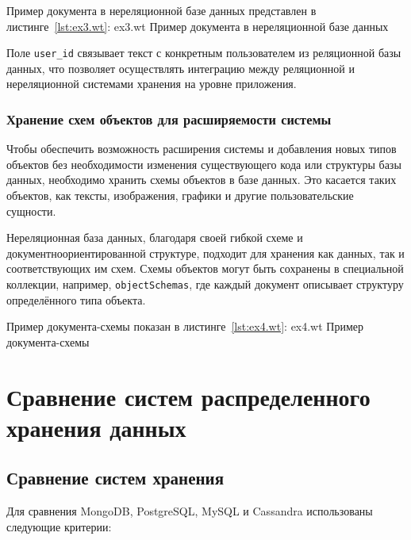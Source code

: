 Пример документа в нереляционной базе данных представлен в листинге~\ref{lst:ex3.wt}:
	{ex3.wt}
	{Пример документа в нереляционной базе данных}

Поле \texttt{user\_id} связывает текст с конкретным пользователем из реляционной базы данных, что позволяет осуществлять интеграцию между реляционной и нереляционной системами хранения на уровне приложения. 

\subsubsection{Хранение схем объектов для расширяемости системы}

Чтобы обеспечить возможность расширения системы и добавления новых типов объектов без необходимости изменения существующего кода или структуры базы данных, необходимо хранить схемы объектов в базе данных. 
Это касается таких объектов, как тексты, изображения, графики и другие пользовательские сущности.

Нереляционная база данных, благодаря своей гибкой схеме и документноориентированной структуре, подходит для хранения как данных, так и соответствующих им схем.
Схемы объектов могут быть сохранены в специальной коллекции, например, \texttt{objectSchemas}, где каждый документ описывает структуру определённого типа объекта.

Пример документа-схемы показан в листинге~\ref{lst:ex4.wt}:
	{ex4.wt}
	{Пример документа-схемы}

\clearpage

\section{Сравнение систем распределенного хранения данных}

\subsection{Сравнение систем хранения}

Для сравнения MongoDB, PostgreSQL, MySQL и Cassandra использованы следующие критерии:

